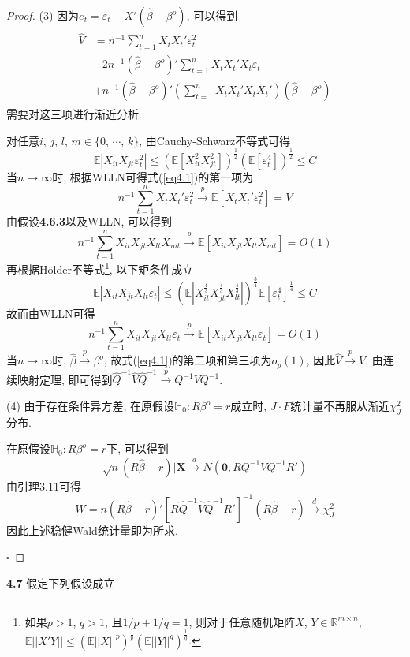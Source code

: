 \documentclass[cn,12pt,math=mtpro2,citestyle=gb7714-2015,bibstyle=gb7714-2015,twocol,mode=simple]{elegantbook}
\newcommand{\E}{\mathbb{E}}
\newcommand{\hbeta}{\hat{\beta}}
\begin{document}
\begin{proof}
    (3) 因为$e_t=\varepsilon_t-X'(\hbeta-\beta^o)$, 可以得到
    \begin{align*}\label{eq4.1}
    \begin{split}
    \hat{V}&=n^{-1}\sum_{t=1}^{n}X_tX_t'\varepsilon_t^2 \\
    &-2n^{-1}(\hbeta-\beta^o){'}\sum_{t=1}^{n}X_tX_t'X_t\varepsilon_t\\
    &+n^{-1}(\hbeta-\beta^o){'}\left(\sum_{t=1}^{n}X_tX_t'X_tX_t'\right)(\hbeta-\beta^o)
    \end{split}\tag{4.1}
    \end{align*}
    需要对这三项进行渐近分析.

    对任意$i$, $j$, $l$, $m \in \{0$, $\cdots$, $k\}$, 由Cauchy-Schwarz不等式可得
    $$\E|X_{it}X_{jt}\varepsilon_t^2|\leq(\E[X_{it}^2X_{jt}^2])^{\frac{1}{2}}(\E[\varepsilon_t^4])^{\frac{1}{2}}\leq C$$
   当$n \rightarrow \infty$时, 根据WLLN可得式(\ref{eq4.1})的第一项为
    $$n^{-1}\sum_{t=1}^{n}X_tX_t'\varepsilon_t^2\xrightarrow{p}\E[X_tX_t'\varepsilon_t^2]=V$$
    由假设\textbf{4.6.3}以及WLLN, 可以得到
    $$n^{-1}\sum_{t=1}^{n}X_{it}X_{jt}X_{lt}X_{mt}\xrightarrow{p}\E[X_{it}X_{jt}X_{lt}X_{mt}]=O(1)$$
    再根据Hölder不等式\footnote{如果$p>1$, $q>1$, 且$1/p+1/q=1$, 则对于任意随机矩阵$X$, $Y\in \mathbb{R}^{m\times n}$, $\E||X'Y||\leq(\E||X||^p)^{\frac{1}{p}}(\E||Y||^q)^{\frac{1}{q}}$.}, 以下矩条件成立
    $$\E|X_{it}X_{jt}X_{lt}\varepsilon_t|\leq(\E|X_{it}^{\frac{4}{3}}X_{jt}^{\frac{4}{3}}X_{lt}^{\frac{4}{3}}|)^{\frac{3}{4}}\E[\varepsilon_t^4]^{\frac{1}{4}}\leq C$$
    故而由WLLN可得
    $$n^{-1}\sum_{t=1}^{n}X_{it}X_{jt}X_{lt}\varepsilon_t\xrightarrow{p}\E[X_{it}X_{jt}X_{lt}\varepsilon_t]=O(1)$$
    当$n\rightarrow\infty$时, $\hbeta\xrightarrow{p}\beta^o$, 故式(\ref{eq4.1})的第二项和第三项为$o_p(1)$,
    因此$\hat{V}\xrightarrow{p}V$, 由连续映射定理, 即可得到$\hat{Q}^{-1}\hat{V}\hat{Q}^{-1}\xrightarrow{p}Q^{-1}VQ^{-1}$.

    (4) 由于存在条件异方差, 在原假设$\mathbb{H}_0: R\beta^o=r$成立时, $J\cdot F$统计量不再服从渐近$\chi^2_J$分布.

    在原假设$\mathbb{H}_0: R\beta^o=r$下, 可以得到
    $$\sqrt{n}(R\hbeta-r)|\mathbf{X}\xrightarrow{d}N(\mathbf{0},RQ^{-1}VQ^{-1}R')$$
    由引理3.11可得
    $$W=n(R\hbeta-r)'[R\hat{Q}^{-1}\hat{V}\hat{Q}^{-1}R']^{-1}(R\hbeta-r)\xrightarrow{d}\chi^2_J$$
    因此上述稳健Wald统计量即为所求.

    $\square$
  \end{proof}

\textbf{4.7} 假定下列假设成立
\end{document}
